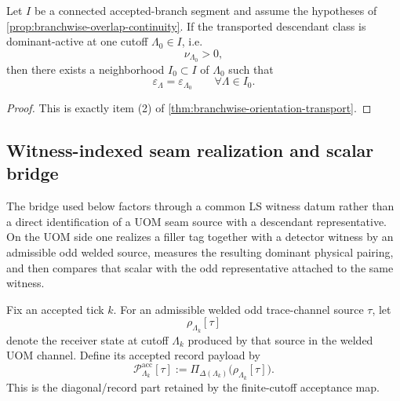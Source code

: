\documentclass[11pt]{article}
\begin{document}
\begin{corollary}
\label{cor:branchwise-orientation-local}
Let \(I\) be a connected accepted-branch segment and assume the hypotheses of
\cref{prop:branchwise-overlap-continuity}.
If the transported descendant class is dominant-active at one cutoff \(\Lambda_0\in I\), i.e.
\[
\nu_{\Lambda_0}>0,
\]
then there exists a neighborhood \(I_0\subset I\) of \(\Lambda_0\) such that
\[
\varepsilon_{\Lambda}=\varepsilon_{\Lambda_0}
\qquad
\forall \Lambda\in I_0.
\]
\end{corollary}

\begin{proof}
This is exactly item (2) of \cref{thm:branchwise-orientation-transport}.
\end{proof}

\subsection*{Witness-indexed seam realization and scalar bridge}
\label{subsec:witness-seam-bridge}

The bridge used below factors through a common LS witness datum rather than a direct identification
of a UOM seam source with a descendant representative.
On the UOM side one realizes a filler tag together with a detector witness by an admissible odd
welded source, measures the resulting dominant physical pairing, and then compares that scalar with
the odd representative attached to the same witness.

\begin{definition}
\label{def:accepted-record-payload}
Fix an accepted tick \(k\).
For an admissible welded odd trace-channel source \(\tau\), let
\[
\rho_{\Lambda_k}[\tau]
\]
denote the receiver state at cutoff \(\Lambda_k\) produced by that source in the welded UOM channel.
Define its accepted record payload by
\begin{equation}
\mathcal P^{\mathrm{acc}}_{\Lambda_k}[\tau]
:=
\Pi_{\Delta(\Lambda_k)}\!\big(\rho_{\Lambda_k}[\tau]\big).
\label{eq:accepted-record-payload}
\end{equation}
This is the diagonal/record part retained by the finite-cutoff acceptance map.
\end{definition}
\end{document}
